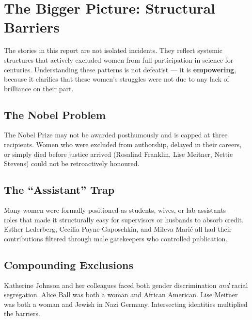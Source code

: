 \documentclass[12pt,a4paper]{article}
\begin{document}
\newpage

\section*{The Bigger Picture: Structural Barriers}

\begin{tcolorbox}[motivationbox, title={Why This Kept Happening}]

The stories in this report are not isolated incidents. They reflect systemic structures that actively excluded women from full participation in science for centuries. Understanding these patterns is not defeatist — it is \textbf{empowering}, because it clarifies that these women's struggles were not due to any lack of brilliance on their part.

\end{tcolorbox}

\vspace{8pt}

\subsection*{The Nobel Problem}
The Nobel Prize may not be awarded posthumously and is capped at three recipients. Women who were excluded from authorship, delayed in their careers, or simply died before justice arrived (Rosalind Franklin, Lise Meitner, Nettie Stevens) could not be retroactively honoured.

\subsection*{The ``Assistant'' Trap}
Many women were formally positioned as students, wives, or lab assistants — roles that made it structurally easy for supervisors or husbands to absorb credit. Esther Lederberg, Cecilia Payne-Gaposchkin, and Mileva Mari\'{c} all had their contributions filtered through male gatekeepers who controlled publication.

\subsection*{Compounding Exclusions}
Katherine Johnson and her colleagues faced both gender discrimination \emph{and} racial segregation. Alice Ball was both a woman and African American. Lise Meitner was both a woman and Jewish in Nazi Germany. Intersecting identities multiplied the barriers.
\end{document}

